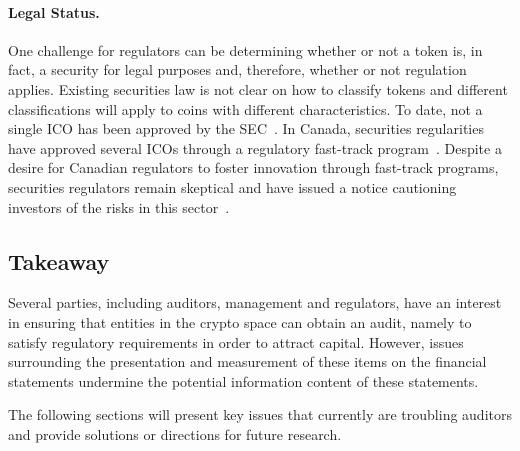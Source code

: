 \paragraph{Legal Status.} One challenge for regulators can be determining whether or not a token is, in fact, a security for legal purposes and, therefore, whether or not regulation applies. Existing securities law is not clear on how to classify tokens and different classifications will apply to coins with different characteristics. To date, not a single ICO has been approved by the SEC~\cite{SECICO2017}. In Canada, securities regularities have approved several ICOs through a regulatory fast-track program~\cite{fastTrackICOImpakt}. Despite a desire for Canadian regulators to foster innovation through fast-track programs, securities regulators remain skeptical and have issued a notice cautioning investors of the risks in this sector~\cite{CSAICO2017}. 


\subsection{Takeaway}
Several parties, including auditors, management and regulators, have an interest in ensuring that entities in the crypto space can obtain an audit, namely to satisfy regulatory requirements in order to attract capital. However, issues surrounding the presentation and measurement of these items on the financial statements undermine the potential information content of these statements. 

The following sections will present key issues that currently are troubling auditors and provide solutions or directions for future research. 

